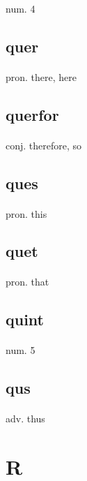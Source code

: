 \documentclass[UTF8]{article}
\begin{document}
    \paragraph{} num. 4 
    \subsection{quer}
    \paragraph{} pron. there, here 
    \subsection{querfor}
    \paragraph{} conj. therefore, so 
    \subsection{ques}
    \paragraph{} pron. this 
    \subsection{quet}
    \paragraph{} pron. that 
    \subsection{quint}
    \paragraph{} num. 5 
    \subsection{qus}
    \paragraph{} adv. thus
    \newpage \section{R}
\end{document}
